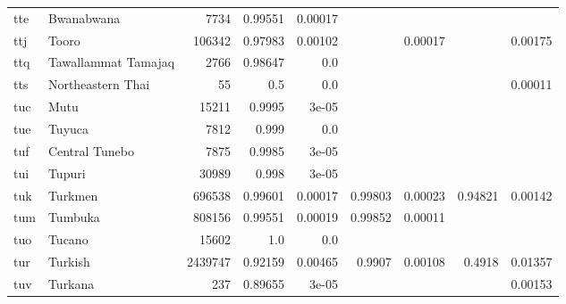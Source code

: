 \documentclass[11pt]{article}
\begin{document}
\begin{table*}[h]
{\begin{tabular}{llrrrrrrr}
tte         & Bwanabwana         & 7734         & 0.99551         & 0.00017         &          &          &          &          \\

ttj         & Tooro         & 106342         & 0.97983         & 0.00102         &          & 0.00017         &          & 0.00175         \\

ttq         & Tawallammat Tamajaq         & 2766         & 0.98647         & 0.0         &          &          &          &          \\

tts         & Northeastern Thai         & 55         & 0.5         & 0.0         &          &          &          & 0.00011         \\

tuc         & Mutu         & 15211         & 0.9995         & 3e-05         &          &          &          &          \\

tue         & Tuyuca         & 7812         & 0.999         & 0.0         &          &          &          &          \\

tuf         & Central Tunebo         & 7875         & 0.9985         & 3e-05         &          &          &          &          \\

tui         & Tupuri         & 30989         & 0.998         & 3e-05         &          &          &          &          \\

tuk         & Turkmen         & 696538         & 0.99601         & 0.00017         & 0.99803         & 0.00023         & 0.94821         & 0.00142         \\

tum         & Tumbuka         & 808156         & 0.99551         & 0.00019         & 0.99852         & 0.00011         &          &          \\

tuo         & Tucano         & 15602         & 1.0         & 0.0         &          &          &          &          \\

tur         & Turkish         & 2439747         & 0.92159         & 0.00465         & 0.9907         & 0.00108         & 0.4918         & 0.01357         \\

tuv         & Turkana         & 237         & 0.89655         & 3e-05         &          &          &          & 0.00153         \\


\end{tabular}}
\end{table*}
\end{document}
